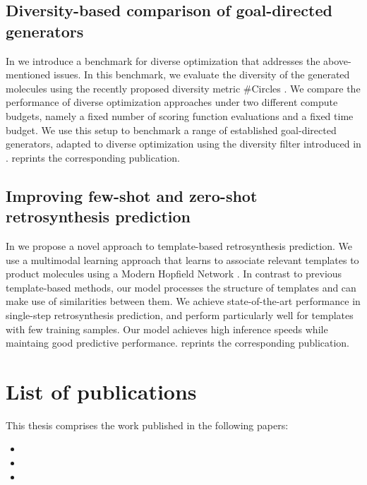 \subsection{Diversity-based comparison of goal-directed generators\label{sec:divopt}} In
\citep{renzDiverseHitsNovo2024} we introduce a benchmark for diverse optimization that addresses the
above-mentioned issues. In this benchmark, we evaluate the diversity of the generated molecules
using the recently proposed diversity metric \#Circles \citep{xieHowMuchSpace2023}. We compare the
performance of diverse optimization approaches under two different compute budgets, namely a fixed
number of scoring function evaluations and a fixed time budget. We use this setup to benchmark a
range of established goal-directed generators, adapted to diverse optimization using the diversity
filter introduced in \citep{blaschkeMemoryassistedReinforcementLearning2020}.
 reprints the corresponding publication.

\subsection{Improving few-shot and zero-shot retrosynthesis prediction}
In \citep{seidlImprovingFewZeroShot2022} we propose a novel approach to template-based
retrosynthesis prediction. We use a multimodal learning approach that learns to associate relevant
templates to product molecules using a Modern Hopfield Network
\citep{ramsauerHopfieldNetworksAll2020}. In contrast to previous template-based methods, our model
processes the structure of templates and can make use of similarities between them. We achieve
state-of-the-art performance in single-step retrosynthesis prediction, and perform particularly well
for templates with few training samples. Our model achieves high inference speeds while maintaing
good predictive performance.  reprints the corresponding publication.

\section{List of publications\label{sec:publications}} This thesis comprises the work published in
the following papers:

\begin{itemize}
      \item {}
      \item {}
      \item {}
\end{itemize}

